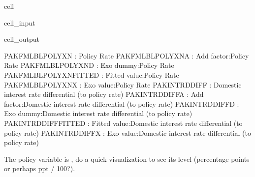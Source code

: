 \documentclass[letterpaper,10pt,english]{jupyterBook}
\begin{document}
\begin{sphinxuseclass}{cell}\begin{sphinxVerbatimInput}

\begin{sphinxuseclass}{cell_input}
\begin{sphinxVerbatim}[commandchars=\\\{\}]
\PYG{p}{[}\PYG{p}{]}
\end{sphinxVerbatim}

\end{sphinxuseclass}\end{sphinxVerbatimInput}
\begin{sphinxVerbatimOutput}

\begin{sphinxuseclass}{cell_output}
\begin{sphinxVerbatim}[commandchars=\\\{\}]
PAKFMLBLPOLYXN        : Policy Rate
PAKFMLBLPOLYXN\PYGZus{}A      : Add factor:Policy Rate
PAKFMLBLPOLYXN\PYGZus{}D      : Exo dummy:Policy Rate
PAKFMLBLPOLYXN\PYGZus{}FITTED : Fitted  value:Policy Rate
PAKFMLBLPOLYXN\PYGZus{}X      : Exo value:Policy Rate
PAKINTRDDIFF          : Domestic interest rate differential (to policy rate)
PAKINTRDDIFF\PYGZus{}A        : Add factor:Domestic interest rate differential (to policy rate)
PAKINTRDDIFF\PYGZus{}D        : Exo dummy:Domestic interest rate differential (to policy rate)
PAKINTRDDIFF\PYGZus{}FITTED   : Fitted  value:Domestic interest rate differential (to policy rate)
PAKINTRDDIFF\PYGZus{}X        : Exo value:Domestic interest rate differential (to policy rate)
\end{sphinxVerbatim}

\end{sphinxuseclass}\end{sphinxVerbatimOutput}

\end{sphinxuseclass}
\sphinxAtStartPar
The policy variable is , do a quick visualization to see its level (percentage points or perhaps ppt / 100?).
\end{document}
